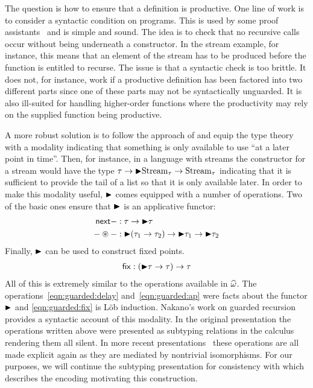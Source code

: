 The question is how to ensure that a definition is productive. One
line of work is to consider a syntactic condition on programs. This is
used by some proof assistants~\citep{coq} and is simple and
sound. The idea is to check that no recursive calls occur without
being underneath a constructor. In the stream example, for instance,
this means that an element of the stream has to be produced before the
function is entitled to recurse. The issue is that a syntactic check
is too brittle. It does not, for instance, work if a productive
definition has been factored into two different parts since one of
these parts may not be syntactically unguarded. It is also ill-suited
for handling higher-order functions where the productivity may rely on
the supplied function being productive.

A more robust solution is to follow the approach of
\citet{Nakano:00} and equip the type theory with a modality
indicating that something is only available to use ``at a later point
in time''. Then, for instance, in a language with streams the
constructor for a stream would have the type
$\tau \to {\blacktriangleright} \mathrm{Stream}_\tau \to \mathrm{Stream}_\tau$
indicating that it is sufficient to provide the tail of a list so that
it is only available later. In order to make this modality useful,
${\blacktriangleright}$ comes equipped with a number of operations. Two of the basic
ones ensure that ${\blacktriangleright}$ is an applicative functor:
\begin{align}
  \mathsf{next}{-} &: \tau \to {\blacktriangleright} \tau\label{eqn:guarded:delay}\\
  - \circledast - &: {\blacktriangleright} (\tau_1 \to \tau_2) \to {\blacktriangleright} \tau_1 \to {\blacktriangleright} \tau_2\label{eqn:guarded:ap}
\end{align}
Finally, ${\blacktriangleright}$ can be used to construct fixed points.
\begin{align}
  \mathsf{fix}{} : ({\blacktriangleright} \tau \to \tau) \to \tau \label{eqn:guarded:fix}
\end{align}
All of this is extremely similar to the operations available in
$\widehat{\omega}$. The operations~\ref{eqn:guarded:delay}
and~\ref{eqn:guarded:ap} were facts about the functor ${\blacktriangleright}$ and
\ref{eqn:guarded:fix} is L\"ob induction. Nakano's work on guarded
recursion provides a syntactic account of this modality. In the
original presentation the operations written above were presented as
subtyping relations in the calculus rendering them all silent. In more
recent
presentations~\citep{Birkedal:steps:11,Bizjak:16,Birkedal:16,Bahr:17}
these operations are all made explicit again as they are mediated by
nontrivial isomorphisms. For our purposes, we will continue the
subtyping presentation for consistency with \citet{Pottier:11} which
describes the encoding motivating this construction.


